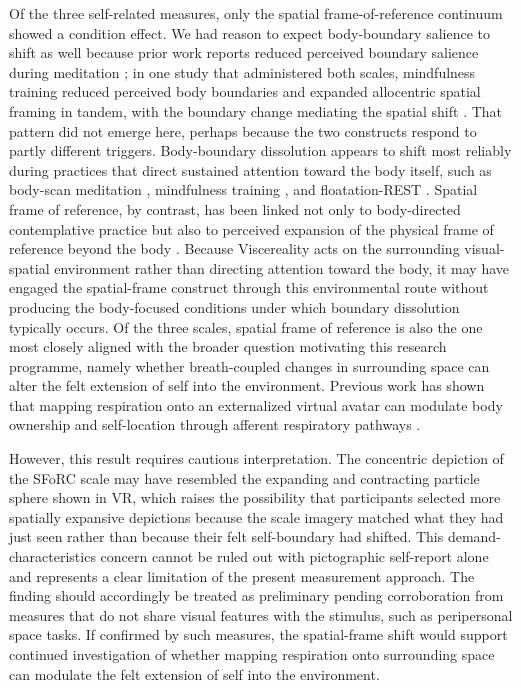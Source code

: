 \documentclass[pdflatex,sn-basic,lineno]{sn-jnl}
\begin{document}
Of the three self-related measures, only the spatial frame-of-reference continuum showed a condition effect. We had reason to expect body-boundary salience to shift as well because prior work reports reduced perceived boundary salience during meditation \citep{Dambrun2016}; in one study that administered both scales, mindfulness training reduced perceived body boundaries and expanded allocentric spatial framing in tandem, with the boundary change mediating the spatial shift \citep{Hanley2020}. That pattern did not emerge here, perhaps because the two constructs respond to partly different triggers. Body-boundary dissolution appears to shift most reliably during practices that direct sustained attention toward the body itself, such as body-scan meditation \citep{Dambrun2016}, mindfulness training \citep{Hanley2020}, and floatation-REST \citep{Feinstein2024}. Spatial frame of reference, by contrast, has been linked not only to body-directed contemplative practice \citep{Hanley2020} but also to perceived expansion of the physical frame of reference beyond the body \citep{Dambrun2021}. Because Viscereality acts on the surrounding visual-spatial environment rather than directing attention toward the body, it may have engaged the spatial-frame construct through this environmental route without producing the body-focused conditions under which boundary dissolution typically occurs. Of the three scales, spatial frame of reference is also the one most closely aligned with the broader question motivating this research programme, namely whether breath-coupled changes in surrounding space can alter the felt extension of self into the environment. Previous work has shown that mapping respiration onto an externalized virtual avatar can modulate body ownership \citep{MontiEtAl2020} and self-location \citep{Adler2014,Betka2020} through afferent respiratory pathways \citep{Betka2020}.

However, this result requires cautious interpretation. The concentric depiction of the SFoRC scale may have resembled the expanding and contracting particle sphere shown in VR, which raises the possibility that participants selected more spatially expansive depictions because the scale imagery matched what they had just seen rather than because their felt self-boundary had shifted. This demand-characteristics concern cannot be ruled out with pictographic self-report alone and represents a clear limitation of the present measurement approach. The finding should accordingly be treated as preliminary pending corroboration from measures that do not share visual features with the stimulus, such as peripersonal space tasks. If confirmed by such measures, the spatial-frame shift would support continued investigation of whether mapping respiration onto surrounding space can modulate the felt extension of self into the environment.
\end{document}

